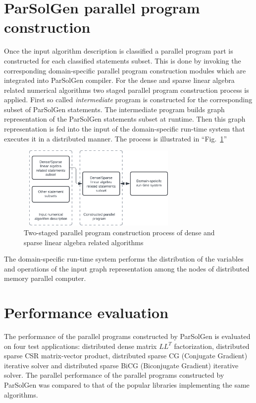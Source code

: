 \documentclass[conference]{IEEEtran}
\begin{document}
\section{ParSolGen parallel program construction}
Once the input algorithm description is classified a parallel program part is constructed 
for each classified statements subset. This is done by invoking the corresponding domain-specific 
parallel program construction modules which are integrated into ParSolGen compiler.  
For the dense and sparse linear algebra related numerical algorithms two staged parallel 
program construction process is applied. First so called \textit{intermediate} program is 
constructed for the corresponding subset of ParSolGen statements. The intermediate  
program builds graph representation of the ParSolGen statements subset at runtime. 
Then this graph representation is fed into the input of the domain-specific 
run-time system that executes it in a distributed manner. 
The process is illustrated in ``Fig.~\ref{fig_3}''

\begin{figure}[htbp]
	\centerline{\includegraphics[width=8cm, height=4cm]{fig_3.png}}
	\caption{Two-staged parallel program construction process of dense and sparse linear algebra related algorithms}
	\label{fig_3}
\end{figure}

The domain-specific run-time system performs the distribution of the variables and operations 
of the input graph representation among the nodes of distributed memory parallel computer. 

\section{Performance evaluation}
The performance of the parallel programs constructed by ParSolGen is evaluated on four 
test applications: distributed dense matrix \(LL^T\) factorization, distributed sparse CSR 
matrix-vector product, distributed sparse CG (Conjugate Gradient) iterative solver and 
distributed sparse BiCG (Biconjugate Gradient) iterative solver. The parallel performance of 
the parallel programs constructed by ParSolGen was compared to that of the popular 
libraries implementing the same algorithms.
\end{document}
